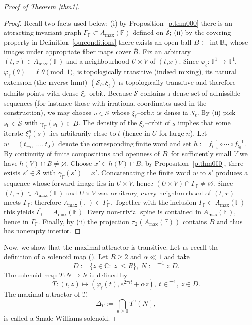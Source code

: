 \documentclass[11pt,reqno]{amsart}
\theoremstyle{plain}
\newtheorem*{theorem A}{Theorem A}
\newtheorem*{theorem B}{Theorem B}
\newtheorem*{theorem C}{Theorem C}
\newtheorem*{theorem 1}{Theorem 1}
\newtheorem*{theorem 2}{Theorem 2}
\newtheorem*{theorem 3}{Theorem 3}
\numberwithin{equation}{section}
\begin{document}
\begin{proof}[Proof of Theorem \ref{thm1}]
\begin{proof}
Recall two facts used below: (i) by Proposition~\ref{p.thm000} there is an attracting invariant graph $\Gamma_{\mathbb F}\subset A_{\max}(\mathbb F)$ defined on $\widetilde{\mathcal S}$; (ii) by the covering property in Definition~\ref{ourconditions} there exists an open ball $B\subset\operatorname{int}\mathbb B_n$ whose images under appropriate fiber maps cover $\overline B$.
Fix an arbitrary $(t,x)\in A_{\max}(\mathbb F)$ and a neighbourhood $U\times V$ of $(t,x)$.
Since $\varphi_\ell:\mathbb T^1\to\mathbb T^1$, $\varphi_\ell(\theta)=\ell\theta\pmod1$, is topologically transitive (indeed mixing), its natural extension (the inverse limit) $(\mathcal S_\ell,\xi_\ell)$ is topologically transitive and therefore admits points with dense $\xi_\ell$--orbit.
Because $\widetilde{\mathcal S}$ contains a dense set of admissible sequences (for instance those with irrational coordinates used in the construction), we may choose $s\in\widetilde{\mathcal S}$ whose $\xi_\ell$--orbit is dense in $\mathcal S_\ell$.
By (ii) pick $s_0\in\widetilde{\mathcal S}$ with $\gamma_{\mathbb F}(s_0)\in B$. The density of the $\xi_\ell$--orbit of $s$ implies that some iterate $\xi_\ell^n(s)$ lies arbitrarily close to $t$ (hence in $U$ for large $n$). Let $w=(t_{-n},\dots,t_0)$ denote the corresponding finite word and set $h:=f_{t_{-n}}^{-1}\circ\cdots\circ f_{t_0}^{-1}$. By continuity of finite compositions and openness of $B$, for sufficiently small $V$ we have $h(V)\cap B\neq\varnothing$. Choose $x'\in h(V)\cap B$; by Proposition~\ref{p.thm000}, there exists $s'\in\widetilde{\mathcal S}$ with $\gamma_{\mathbb F}(s')=x'$. Concatenating the finite word $w$ to $s'$ produces a sequence whose forward image lies in $U\times V$, hence $(U\times V)\cap\Gamma_{\mathbb F}\neq\varnothing$.
Since $(t,x)\in A_{\max}(\mathbb F)$ and $U\times V$ was arbitrary, every neighbourhood of $(t,x)$ meets $\Gamma_{\mathbb F}$; therefore $A_{\max}(\mathbb F)\subset\overline{\Gamma_{\mathbb F}}$. Together with the inclusion $\Gamma_{\mathbb F}\subset A_{\max}(\mathbb F)$ this yields $\overline{\Gamma_{\mathbb F}}=A_{\max}(\mathbb F)$. Every non-trivial spine is contained in $A_{\max}(\mathbb F)$, hence in $\overline{\Gamma_{\mathbb F}}$. Finally, by (ii) the projection $\pi_2(A_{\max}(\mathbb F))$ contains $B$ and thus has nonempty interior.
\end{proof}

Now, we show that the maximal attractor is transitive.
Let us recall the definition of a solenoid map (\cite{williams1974expanding}). Let $R \geq 2$ and $\alpha \ll 1$ and take
$$D:=\{z \in \mathbb{C} : |z| \leq R\}, \ N:=\mathbb{T}^1 \times D. $$
The solenoid map $T : N \to N$ is defined by
$$T : (t,z) \mapsto (\varphi_\ell(t), e^{2\pi i t}+ \alpha z), \ t\in \mathbb{T}^1, \ z\in D.$$
 The maximal attractor of $T$,
$$\Delta_T:=\bigcap_{n\geq 0}T^n(N),$$
is called a Smale-Williams solenoid.


\end{proof}
\end{document}
